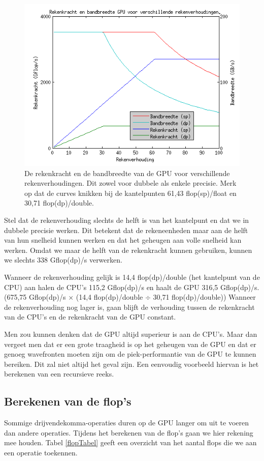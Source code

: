 \begin{figure}
\centering
\includegraphics{kantelpunt}
\caption{\label{kantelpunt}De rekenkracht en de bandbreedte van de GPU voor verschillende rekenverhoudingen. Dit zowel voor dubbele als enkele precisie. Merk op dat de curves knikken bij de kantelpunten 61,43 flop(sp)/float en 30,71 flop(dp)/double.}
\end{figure}

Stel dat de rekenverhouding slechts de helft is van het kantelpunt en dat we in dubbele precisie werken. Dit betekent dat de rekeneenheden maar aan de helft van hun snelheid kunnen werken en dat het geheugen aan volle snelheid kan werken. Omdat we maar de helft van de rekenkracht kunnen gebruiken, kunnen we slechts 338 Gflop(dp)/s verwerken.

Wanneer de rekenverhouding gelijk is 14,4 flop(dp)/double (het kantelpunt van de CPU) aan halen de CPU's 115,2 Gflop(dp)/s en haalt de GPU 316,5 Gflop(dp)/s. (675,75 Gflop(dp)/s $\times$ (14,4 flop(dp)/double $\div$ 30,71 flop(dp)/double)) Wanneer de rekenverhouding nog lager is, gaan blijft de verhouding tussen de rekenkracht van de CPU's en de rekenkracht van de GPU constant.

Men zou kunnen denken dat de GPU altijd superieur is aan de CPU's. Maar dan vergeet men dat er een grote traagheid is op het geheugen van de GPU en dat er genoeg wavefronten moeten zijn om de piek-performantie van de GPU te kunnen bereiken. Dit zal niet altijd het geval zijn. Een eenvoudig voorbeeld hiervan is het berekenen van een recursieve reeks.

\subsection{Berekenen van de flop's}
Sommige drijvendekomma-operaties duren op de GPU langer om uit te voeren dan andere operaties. Tijdens het berekenen van de flop's gaan we hier rekening mee houden. Tabel \ref{flopTabel} geeft een overzicht van het aantal flops die we aan een operatie toekennen.

